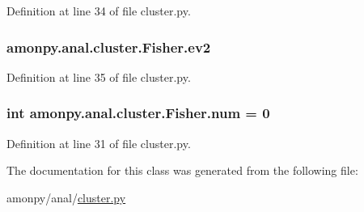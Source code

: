 Definition at line 34 of file cluster.\-py.

\hypertarget{classamonpy_1_1anal_1_1cluster_1_1_fisher_ab2cce79b453ffcfced2266553ea60d19}{
\subsubsection[{ev2}]{\setlength{\rightskip}{0pt plus 5cm}amonpy.\-anal.\-cluster.\-Fisher.\-ev2}}\label{classamonpy_1_1anal_1_1cluster_1_1_fisher_ab2cce79b453ffcfced2266553ea60d19}


Definition at line 35 of file cluster.\-py.

\hypertarget{classamonpy_1_1anal_1_1cluster_1_1_fisher_a2c44a65df3f24bc786522df8d5aa2db7}{
\subsubsection[{num}]{\setlength{\rightskip}{0pt plus 5cm}int amonpy.\-anal.\-cluster.\-Fisher.\-num = 0\hspace{0.3cm}{\ttfamily [static]}}}\label{classamonpy_1_1anal_1_1cluster_1_1_fisher_a2c44a65df3f24bc786522df8d5aa2db7}


Definition at line 31 of file cluster.\-py.



The documentation for this class was generated from the following file\-:\begin{DoxyCompactItemize}
\item 
amonpy/anal/\hyperlink{cluster_8py}{cluster.\-py}\end{DoxyCompactItemize}
